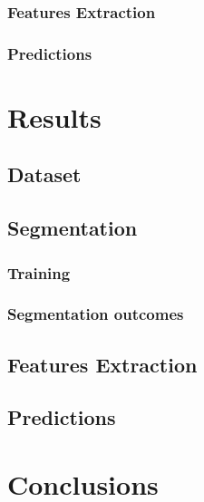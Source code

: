 \documentclass[12pt,a4paper]{report}
\begin{document}
\subsection{Features Extraction}
\subsection{Predictions}


\chapter{Results}


\section{Dataset}

\section{Segmentation}

\subsection{Training}
\subsection{Segmentation outcomes}

\section{Features Extraction}

\section{Predictions}


\chapter{Conclusions}


\clearpage



\end{document}
